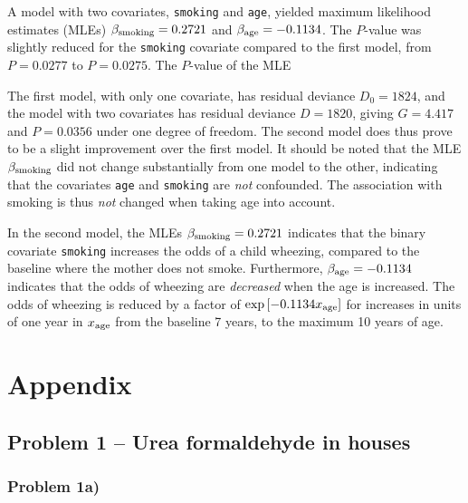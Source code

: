 \documentclass[a4paper,11pt]{article}
\begin{document}
\begin{enumerate}[label=3\alph*)]
        A model with two covariates, \texttt{smoking} and \texttt{age}, yielded maximum likelihood estimates (MLEs) $\beta_{\rm smoking} = 0.2721$ and $\beta_{\rm age} = -0.1134$. The $P$-value was slightly reduced for the \texttt{smoking} covariate compared to the first model, from $P = 0.0277$ to $P= 0.0275$. The $P$-value of the MLE 

        The first model, with only one covariate, has residual deviance $D_0 = 1824$, and the model with two covariates has residual deviance $D = 1820$, giving $G = 4.417$ and $P = 0.0356$ under one degree of freedom. The second model does thus prove to be a slight improvement over the first model. It should be noted that the MLE $\beta_{\rm smoking}$ did not change substantially from one model to the other, indicating that the covariates \texttt{age} and \texttt{smoking} are \textit{not} confounded. The association with smoking is thus \textit{not} changed when taking age into account.

        In the second model, the MLEs $\beta_{\rm smoking} = 0.2721$ indicates that the binary covariate \texttt{smoking} increases the odds of a child wheezing, compared to the baseline where the mother does not smoke. Furthermore, $\beta_{\rm age} = -0.1134$ indicates that the odds of wheezing are \textit{decreased} when the age is increased. The odds of wheezing is reduced by a factor of $\exp\left[ -0.1134 x_{\rm age} \right]$ for increases in units of one year in $x_{\rm age}$ from the baseline 7 years, to the maximum 10 years of age. 

\end{enumerate}



%
%

\clearpage
\appendix
\section{Appendix}
\label{sec:appendix}

\subsection{Problem 1 -- Urea formaldehyde in houses}
\label{app:1}
\subsubsection{Problem 1a)}
\label{app:1a}
\end{document}
